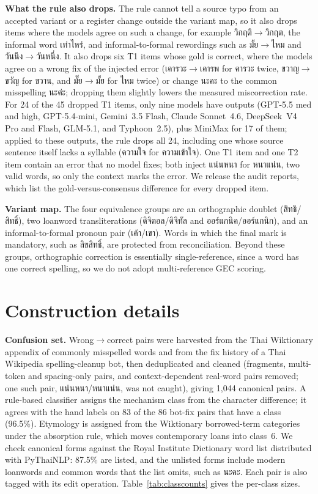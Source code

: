 \documentclass[11pt]{article}
\begin{document}
\textbf{What the rule also drops.} The rule cannot tell a source typo from an accepted variant or
a register change outside the variant map, so it also drops items where the models agree on such
a change, for example วิกฤติ$\to$วิกฤต, the informal word เท่าไหร่, and
informal-to-formal rewordings such as มั้ย$\to$ไหม and วันนึง$\to$วันหนึ่ง. It also drops six T1
items whose gold is correct, where the models agree on a wrong fix of the injected error
(เคารวะ$\to$เคารพ for คารวะ twice, ขวาญ$\to$ขวัญ for ขวาน, and มั๊ย$\to$มั้ย for ไหม twice) or
change นะคะ to the common misspelling นะค่ะ; dropping them slightly lowers the measured
miscorrection rate. For 24 of the 45 dropped T1 items, only nine models have outputs (GPT-5.5
med and high, GPT-5.4-mini, Gemini~3.5 Flash, Claude Sonnet~4.6, DeepSeek~V4 Pro and Flash,
GLM-5.1, and Typhoon~2.5), plus MiniMax for 17 of them; applied to these outputs, the rule drops
all 24, including one whose source sentence itself lacks a
syllable (ความใจ for ความเข้าใจ). One T1 item and one T2 item
contain an error that no model fixes; both inject แน่นหนา for หนาแน่น, two valid words, so only
the context marks the error. We release the audit reports, which list the gold-versus-consensus
difference for every dropped item.

\textbf{Variant map.} The four equivalence groups are an orthographic doublet (สิทธิ/สิทธิ์), two
loanword transliterations (ดิจิตอล/ดิจิทัล and ออร์แกนิค/ออร์แกนิก), and an informal-to-formal
pronoun pair (เค้า/เขา). Words in which the final mark is mandatory, such as ลิขสิทธิ์, are
protected from reconciliation. Beyond these groups, orthographic correction
is essentially single-reference, since a word has one correct spelling, so we do not adopt
multi-reference GEC scoring.

\section{Construction details}
\label{app:construction}
\textbf{Confusion set.} Wrong$\to$correct pairs were harvested from the Thai Wiktionary appendix
of commonly misspelled words and from the fix history of a Thai Wikipedia spelling-cleanup bot,
then deduplicated and cleaned (fragments, multi-token and spacing-only pairs, and
context-dependent real-word pairs removed; one such pair, แน่นหนา/หนาแน่น, was not caught),
giving 1{,}044 canonical pairs. A rule-based
classifier assigns the mechanism class from the character difference; it agrees with the
hand labels on 83 of the 86 bot-fix pairs that have a class (96.5\%). Etymology is assigned from the Wiktionary borrowed-term
categories under the absorption rule, which moves contemporary loans into class~6. We check
canonical forms against the Royal Institute Dictionary word list distributed with PyThaiNLP:
87.5\% are listed, and the unlisted forms include modern loanwords and common words that the list
omits, such as นะคะ. Each pair is also
tagged with its edit operation.
Table~\ref{tab:classcounts} gives the per-class sizes.
\end{document}
